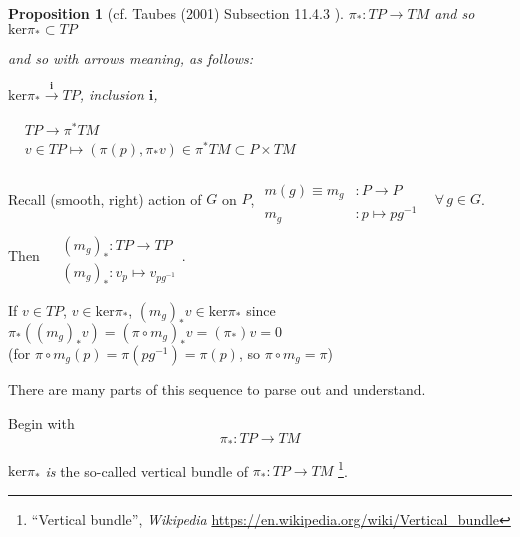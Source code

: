 \documentclass[10pt]{amsart}
\newtheorem{proposition}{Proposition}
\begin{document}
\begin{multicols*}{2}
\begin{proposition}[cf. Taubes (2001) Subsection 11.4.3 \cite{CTaubes2011}]
$\pi_* : TP \to TM$ and so \\
$\text{ker}\pi_* \subset TP$

and so with arrows meaning, as follows:

$\text{ker}{\pi_*} \xrightarrow{ \mathbf{i}} TP$, inclusion $\mathbf{i}$, 

$\begin{aligned} & TP \to \pi^*TM \\
  & v\in TP \mapsto (\pi(p), \pi_*v) \in \pi^*TM \subset P \times TM \end{aligned}$



\end{proposition}

Recall (smooth, right) action of $G$ on $P$, $\begin{aligned} & \quad \\
   m(g) \equiv m_g & : P \to P \\
  m_g & : p\mapsto pg^{-1} \end{aligned}$ \quad \, $\forall \, g \in G$.  Then $\begin{aligned} & \quad \\
  & (m_g)_* : TP \to TP \\
  & (m_g)_*:v_p \mapsto v_{pg^{-1}}\end{aligned}$.  

If $v\in TP$, $v\in \text{ker}\pi_*$, $(m_g)_*v \in \text{ker}\pi_*$ since $\pi_*((m_g)_*v) = (\pi \circ m_g)_*v = (\pi_*)v = 0$ \\
(for $\pi\circ m_g(p) = \pi(pg^{-1}) = \pi(p)$, so $\pi \circ m_g = \pi$)


There are many parts of this sequence to parse out and understand.  

Begin with 
\[
\pi_* : TP \to TM
\]

$\text{ker}{\pi_*}$ \emph{is} the so-called vertical bundle of $\pi_* : TP \to TM$ \footnote{``Vertical bundle'', \emph{Wikipedia} \url{https://en.wikipedia.org/wiki/Vertical_bundle}}.


\end{multicols*}
\end{document}
